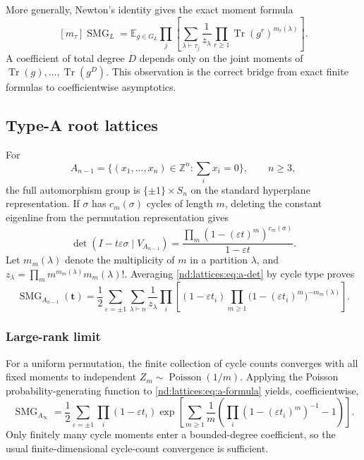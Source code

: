 \documentclass[10pt]{article}
\newcommand{\Tr}{\operatorname{Tr}}
\newcommand{\SMG}{\operatorname{SMG}}
\newcommand{\MGF}{\SMG}
\newcommand{\E}{\mathbb E}
\newcommand{\Z}{\mathbb Z}
\begin{document}
More generally, Newton's identity gives the exact moment formula
\begin{equation}\label{nd:lattices:eq:moment}
 [m_\tau]\MGF_L
 =\E_{g\in G_L}\prod_j\left[
 \sum_{\lambda\vdash\tau_j}\frac1{z_\lambda}
 \prod_{r\ge1}\Tr(g^r)^{m_r(\lambda)}\right].
\end{equation}
A coefficient of total degree $D$ depends only on the joint moments of
$\Tr(g),\ldots,\Tr(g^D)$.  This observation is the correct bridge from exact
finite formulas to coefficientwise asymptotics.

\subsection{Type-A root lattices}

For
\[
 A_{n-1}=\{(x_1,\ldots,x_n)\in\Z^n:\textstyle\sum_i x_i=0\},
 \qquad n\ge3,
\]
the full automorphism group is $\{\pm1\}\times S_n$ on the standard
hyperplane representation.  If $\sigma$ has $c_m(\sigma)$ cycles of length
$m$, deleting the constant eigenline from the permutation representation
gives
\begin{equation}\label{nd:lattices:eq:a-det}
 \det(I-t\varepsilon\sigma\mid V_{A_{n-1}})
 =\frac{\prod_m(1-(\varepsilon t)^m)^{c_m(\sigma)}}{1-\varepsilon t}.
\end{equation}
Let $m_m(\lambda)$ denote the multiplicity of $m$ in a partition $\lambda$,
and $z_\lambda=\prod_m m^{m_m(\lambda)}m_m(\lambda)!$.  Averaging
\eqref{nd:lattices:eq:a-det} by cycle type proves
\begin{equation}\label{nd:lattices:eq:a-formula}
 \boxed{
 \MGF_{A_{n-1}}(\mathbf t)=\frac12\sum_{\varepsilon=\pm1}
 \sum_{\lambda\vdash n}\frac1{z_\lambda}
 \prod_i\left[(1-\varepsilon t_i)
 \prod_{m\ge1}\bigl(1-(\varepsilon t_i)^m\bigr)^{-m_m(\lambda)}\right].}
\end{equation}

\subsubsection*{Large-rank limit}
For a uniform permutation, the finite collection of cycle counts converges
with all fixed moments to independent $Z_m\sim\operatorname{Poisson}(1/m)$.
Applying the Poisson probability-generating function to
\eqref{nd:lattices:eq:a-formula} yields, coefficientwise,
\begin{equation}\label{nd:lattices:eq:a-limit}
 \boxed{
 \MGF_{A_\infty}=\frac12\sum_{\varepsilon=\pm1}
 \prod_i(1-\varepsilon t_i)
 \exp\!\left[\sum_{m\ge1}\frac1m\left(
 \prod_i(1-(\varepsilon t_i)^m)^{-1}-1\right)\right].}
\end{equation}
Only finitely many cycle moments enter a bounded-degree coefficient, so the
usual finite-dimensional cycle-count convergence is sufficient.
\end{document}
